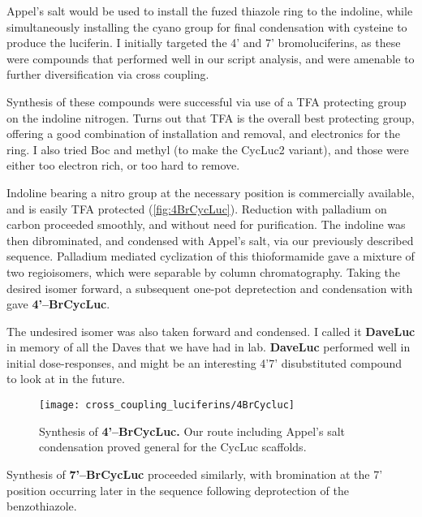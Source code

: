 Appel's salt would be used to install the fuzed thiazole ring to the indoline, while simultaneously installing the cyano group for final condensation with cysteine to produce the luciferin.
I initially targeted the 4' and 7' bromoluciferins, as these were compounds that performed well in our script analysis, and were amenable to further diversification via cross coupling.
\begin{thoughts}
  Synthesis of these compounds were successful via use of a TFA protecting group on the indoline nitrogen. Turns out that TFA is the overall best protecting group, offering a good combination of installation and removal, and electronics for the ring. I also tried Boc and methyl (to make the CycLuc2 variant), and those were either too electron rich, or too hard to remove.
\end{thoughts}
Indoline bearing a nitro group at the necessary position is commercially available, and is easily TFA protected (\autoref{fig:4BrCycLuc}).\cite{ReddyRobustlightemission2010,MoffordAminoluciferinsExtendFirefly2014}
Reduction with palladium on carbon proceeded smoothly, and without need for purification.
The indoline was then dibrominated, and condensed with Appel's salt, via our previously described sequence.\cite{SteinhardtBrominatedLuciferinsAre2016}
Palladium mediated cyclization of this thioformamide gave a mixture of two regioisomers, which were separable by column chromatography.
Taking the desired isomer forward, a subsequent one-pot depretection and condensation with \Dcys{} gave \textbf{4'--BrCycLuc}.
\begin{thoughts}
  The undesired isomer was also taken forward and condensed. I called it \textbf{DaveLuc} in memory of all the Daves that we have had in lab. \textbf{DaveLuc} performed well in initial dose-responses, and might be an interesting 4'7' disubstituted compound to look at in the future.
\end{thoughts}

\begin{figure}[htbp]
\texttt{[image: cross\_coupling\_luciferins/4BrCycluc]} %
\centering
\caption[Synthesis of \textbf{4'--BrCycLuc.}]{
Synthesis of \textbf{4'--BrCycLuc.} Our route including Appel's salt condensation proved general for the CycLuc scaffolds.
}
  \label{fig:4BrCycLuc}
\end{figure}

Synthesis of \textbf{7'--BrCycLuc} proceeded similarly, with bromination at the 7' position occurring later in the sequence following deprotection of the benzothiazole.

